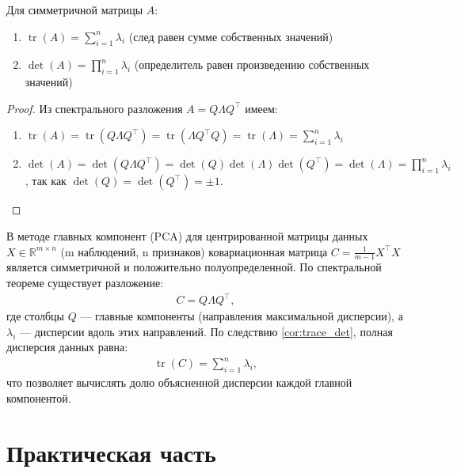 \documentclass[a4paper,12pt]{article}
\begin{document}
\begin{corollary}\label{cor:trace_det}
    Для симметричной матрицы $A$:
    \begin{enumerate}
        \item $\operatorname{tr}(A) = \sum_{i=1}^n \lambda_i$ (след равен сумме собственных значений)
        \item $\det(A) = \prod_{i=1}^n \lambda_i$ (определитель равен произведению собственных значений)
    \end{enumerate}
\end{corollary}

\begin{proof}
    Из спектрального разложения $A = Q\Lambda Q^\top$ имеем:
    \begin{enumerate}
        \item $\operatorname{tr}(A) = \operatorname{tr}(Q\Lambda Q^\top) = \operatorname{tr}(\Lambda Q^\top Q) = \operatorname{tr}(\Lambda) = \sum_{i=1}^n \lambda_i$
        \item $\det(A) = \det(Q\Lambda Q^\top) = \det(Q)\det(\Lambda)\det(Q^\top) = \det(\Lambda) = \prod_{i=1}^n \lambda_i$, так как $\det(Q) = \det(Q^\top) = \pm 1$.
    \end{enumerate}
\end{proof}


\begin{example}
    В методе главных компонент (PCA) для центрированной матрицы данных $X \in \mathbb{R}^{m \times n}$ (m наблюдений, n признаков) ковариационная матрица $C = \frac{1}{m-1}X^\top X$ является симметричной и положительно полуопределенной.
    По спектральной теореме существует разложение:
    \begin{eqnarray}
        C = Q\Lambda Q^\top,
    \end{eqnarray}
    где столбцы $Q$ — главные компоненты (направления максимальной дисперсии), а $\lambda_i$ — дисперсии вдоль этих направлений. По следствию \ref{cor:trace_det}, полная дисперсия данных равна:
    \begin{eqnarray}
        \operatorname{tr}(C) = \sum_{i=1}^n \lambda_i,
    \end{eqnarray}
    что позволяет вычислять долю объясненной дисперсии каждой главной компонентой.
\end{example}




\newpage

\section{Практическая часть}
\label{sec:empirical}
\end{document}

